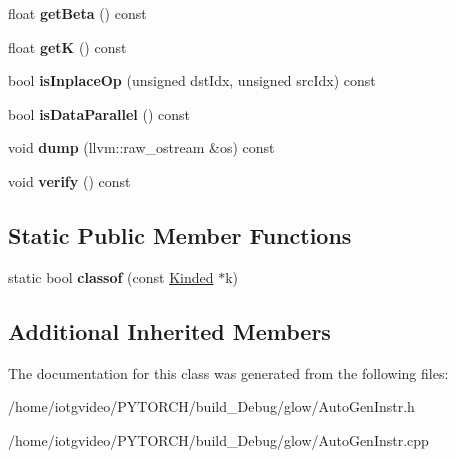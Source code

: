 \begin{DoxyCompactItemize}
float {\bfseries get\+Beta} () const
\item 
\mbox{\label{classglow_1_1_local_response_normalization_inst_ad0b04059f807a3cb8fff96019c47a4ee}} 
float {\bfseries getK} () const
\item 
\mbox{\label{classglow_1_1_local_response_normalization_inst_a83e2d0f5f66c89b925e95d434063c4a4}} 
bool {\bfseries is\+Inplace\+Op} (unsigned dst\+Idx, unsigned src\+Idx) const
\item 
\mbox{\label{classglow_1_1_local_response_normalization_inst_a5047848847dda75979422c91f69e30aa}} 
bool {\bfseries is\+Data\+Parallel} () const
\item 
\mbox{\label{classglow_1_1_local_response_normalization_inst_ad050ff54514cdd916dbbb30899a06b65}} 
void {\bfseries dump} (llvm\+::raw\+\_\+ostream \&os) const
\item 
\mbox{\label{classglow_1_1_local_response_normalization_inst_a0ce8001e40090173d40e7dcfbee2b0a3}} 
void {\bfseries verify} () const
\end{DoxyCompactItemize}
\subsection*{Static Public Member Functions}
\begin{DoxyCompactItemize}
\item 
\mbox{\label{classglow_1_1_local_response_normalization_inst_a965690126fa584f7be7a0b722d80be5f}} 
static bool {\bfseries classof} (const \hyperlink{classglow_1_1_kinded}{Kinded} $\ast$k)
\end{DoxyCompactItemize}
\subsection*{Additional Inherited Members}


The documentation for this class was generated from the following files\+:\begin{DoxyCompactItemize}
\item 
/home/iotgvideo/\+P\+Y\+T\+O\+R\+C\+H/build\+\_\+\+Debug/glow/Auto\+Gen\+Instr.\+h\item 
/home/iotgvideo/\+P\+Y\+T\+O\+R\+C\+H/build\+\_\+\+Debug/glow/Auto\+Gen\+Instr.\+cpp\end{DoxyCompactItemize}
